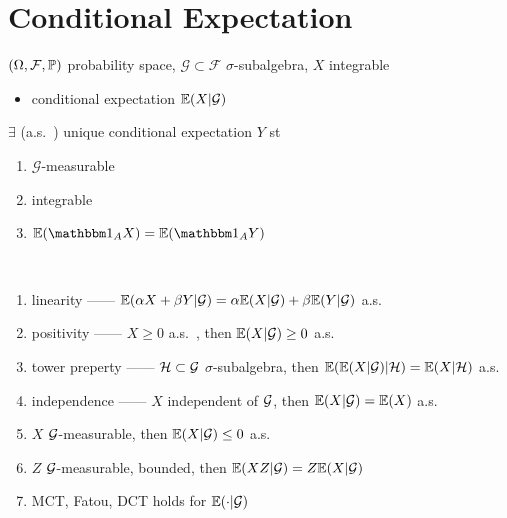 \section{Conditional Expectation}\label{sec:conditional-expectation}

\begin{setting}
    $(\Omega, \mathcal{F}, \mathbb{P})$ probability space, $\mathcal{G} \subset \mathcal{F}$ $\sigma$-subalgebra, $X$ integrable
\end{setting}

\begin{itemize}
    \item conditional expectation $\mathbb{E}(X|\mathcal{G})$
\end{itemize}

\begin{prop}
    $\exists$ (a.s.\ ) unique conditional expectation $Y$ st
    \begin{enumerate}
        \item $\mathcal{G}$-measurable
        \item integrable
        \item $\Ex(\In_A X) = \Ex(\In_A Y)$
    \end{enumerate}
\end{prop}

\begin{prop}\,
    \begin{enumerate}
        \item linearity ------ $\mathbb{E}(\alpha X + \beta Y | \mathcal{G}) = \alpha \mathbb{E}(X|\mathcal{G}) + \beta \mathbb{E}(Y|\mathcal{G})$ a.s.\
        \item positivity ------ $X \geq 0$ a.s.\ , then $\mathbb{E}(X|\mathcal{G}) \geq 0$ a.s.
        \item tower preperty ------ $\mathcal{H} \subset \mathcal{G}$ $\sigma$-subalgebra, then $\mathbb{E}(\mathbb{E}(X|\mathcal{G})|\mathcal{H}) = \mathbb{E}(X|\mathcal{H})$ a.s.\
        \item independence ------ $X$ independent of $\mathcal{G}$, then $\mathbb{E}(X|\mathcal{G}) = \mathbb{E}(X)$ a.s.\
        \item $X$ $\mathcal{G}$-measurable, then $\mathbb{E}(X|\mathcal{G}) \leq 0$ a.s.\
        \item $Z$ $\mathcal{G}$-measurable, bounded, then $\mathbb{E}(XZ|\mathcal{G}) = Z\mathbb{E}(X|\mathcal{G})$
        \item MCT, Fatou, DCT holds for $\mathbb{E}(\cdot|\mathcal{G})$
    \end{enumerate}
\end{prop}